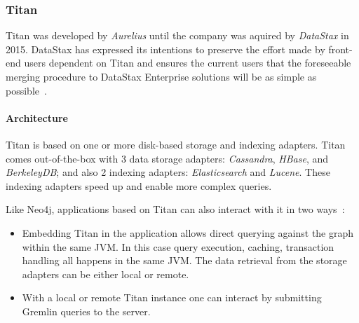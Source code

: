 \subsubsection{Titan}

Titan was developed by \emph{Aurelius} until the company was aquired by \emph{DataStax} in 2015. DataStax has expressed its intentions to preserve the effort made by front-end users dependent on Titan and ensures the current users that the foreseeable merging procedure to DataStax Enterprise solutions will be as simple as possible~\cite{titan-datastax-acquirement}.

\paragraph{Architecture}

Titan is based on one or more disk-based storage and indexing adapters. Titan comes out-of-the-box with 3 data storage adapters: \emph{Cassandra}, \emph{HBase}, and \emph{BerkeleyDB}; and also 2 indexing adapters: \emph{Elasticsearch} and \emph{Lucene}. These indexing adapters speed up and enable more complex queries.

Like Neo4j, applications based on Titan can also interact with it in two ways~\cite{titan-arch}:
\begin{itemize}[topsep=0pt]
  \item Embedding Titan in the application allows direct querying against the graph within the same JVM. In this case query execution, caching, transaction handling all happens in the same JVM. The data retrieval from the storage adapters can be either local or remote.
  \item With a local or remote Titan instance one can interact by submitting Gremlin queries to the server.
\end{itemize}


